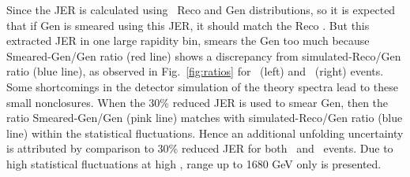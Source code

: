
Since the JER is calculated using \MGP~Reco and Gen \httwo distributions, so it is expected that if Gen \httwo is smeared using this JER, it should match the Reco \httwo. But this extracted JER in one large rapidity bin, smears the Gen \httwo too much because Smeared-Gen/Gen ratio (red line) shows a discrepancy from simulated-Reco/Gen ratio (blue line), as observed in Fig.~\ref{fig:ratios} for \njt~(left) and \njth~(right) events. Some shortcomings in the detector simulation of the theory spectra lead to these small nonclosures. When the 30\% reduced JER is used to smear Gen, then the ratio Smeared-Gen/Gen (pink line) matches with simulated-Reco/Gen ratio (blue line) within the statistical fluctuations. Hence an additional unfolding uncertainty is attributed by comparison to 30\% reduced JER for both \njt~and \njth~events. Due to high statistical fluctuations at high \httwons, range up to 1680 GeV only is presented.

